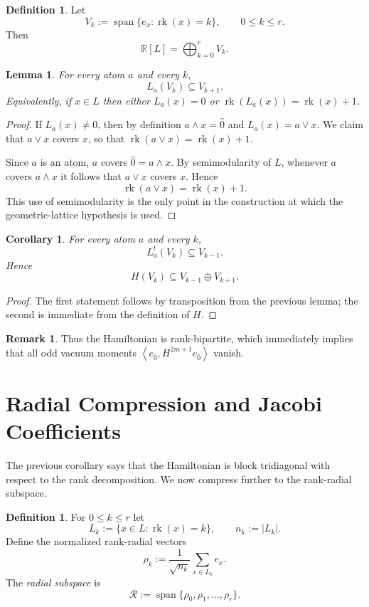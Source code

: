 \documentclass[11pt]{amsart}
\newtheorem{lem}[thm]{Lemma}
\newtheorem{cor}[thm]{Corollary}
\theoremstyle{definition}
\newtheorem{defn}[thm]{Definition}
\newtheorem{remark}[thm]{Remark}
\DeclareMathOperator{\Span}{span}
\DeclareMathOperator{\rk}{rk}
\newcommand{\cc}{\mathcal}
\newcommand{\R}{\mathbb{R}}
\newcommand{\ip}[2]{\left\langle #1, #2 \right\rangle}
\newcommand{\zero}{\hat{0}}
\begin{document}
\begin{defn}
Let
\[
V_k:=\Span\{e_x:\rk(x)=k\},\qquad 0\le k\le r.
\]
Then
\[
\R[L]=\bigoplus_{k=0}^{r} V_k.
\]
\end{defn}

\begin{lem}
For every atom $a$ and every $k$,
\[
L_a(V_k)\subseteq V_{k+1}.
\]
Equivalently, if $x\in L$ then either $L_a(x)=0$ or $\rk(L_a(x))=\rk(x)+1$.
\end{lem}

\begin{proof}
If $L_a(x)\neq 0$, then by definition $a\wedge x=\zero$ and $L_a(x)=a\vee x$. We claim that $a\vee x$ covers $x$, so that $\rk(a\vee x)=\rk(x)+1$.

Since $a$ is an atom, $a$ covers $\zero=a\wedge x$.  By semimodularity of $L$, whenever $a$ covers $a\wedge x$ it follows that $a\vee x$ covers $x$.
Hence
\[
\rk(a\vee x)=\rk(x)+1.
\]
This use of semimodularity is the only point in the construction at which the geometric-lattice hypothesis is used.
\end{proof}

\begin{cor}
For every atom $a$ and every $k$,
\[
L_a^t(V_k)\subseteq V_{k-1}.
\]
Hence
\[
H(V_k)\subseteq V_{k-1}\oplus V_{k+1}.
\]
\end{cor}

\begin{proof}
    The first statement follows by transposition from the previous lemma; the second is immediate from the definition of $H$.
\end{proof}

\begin{remark}
    Thus the Hamiltonian is rank-bipartite, which immediately implies that all odd vacuum moments $\ip{e_{\zero}}{H^{2m+1}e_{\zero}}$ vanish.
\end{remark}



\section{Radial Compression and Jacobi Coefficients}

The previous corollary says that the Hamiltonian is block tridiagonal with respect to the rank decomposition.  We now compress further to the rank-radial subspace.

\begin{defn}
For $0\le k\le r$ let
\[
L_k:=\{x\in L:\rk(x)=k\},\qquad n_k:=|L_k|.
\]
Define the normalized rank-radial vectors
\[
\rho_k:=\frac{1}{\sqrt{n_k}}\sum_{x\in L_k} e_x.
\]
The \emph{radial subspace} is
\[
\cc R:=\Span\{\rho_0,\rho_1,\dots,\rho_r\}.
\]
\end{defn}
\end{document}
